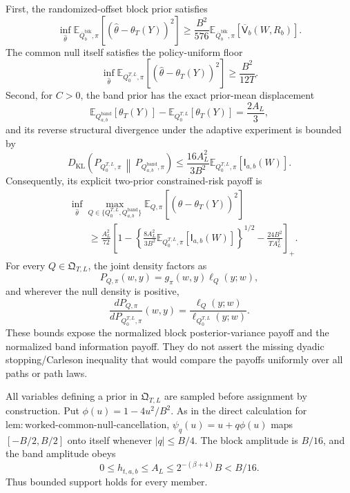 First, the randomized-offset block prior satisfies
\[
 \inf_{\widehat\theta}
 \mathbb E_{\overline Q_b^{\mathrm{blk}},\pi}
 \left[(\widehat\theta-\theta_T(Y))^2\right]
 \ge \frac{B^2}{576}
 \mathbb E_{\overline Q_b^{\mathrm{blk}},\pi}
 [\overline{\mathsf V}_b(W,R_b)].
\]
The common null itself satisfies the policy-uniform floor
\[
 \inf_{\widehat\theta}
 \mathbb E_{Q_0^{T,L},\pi}[(\widehat\theta-\theta_T(Y))^2]
 \ge\frac{B^2}{12T}.
\]
Second, for \(C>0\), the band prior has the exact prior-mean displacement
\[
 \mathbb E_{Q_{a,b}^{\mathrm{band}}}[\theta_T(Y)]
 -\mathbb E_{Q_0^{T,L}}[\theta_T(Y)]
 =\frac{2A_L}{3},
\]
and its reverse structural divergence under the adaptive experiment is bounded by
\[
 D_{\mathrm{KL}}\!\left(
 P_{Q_0^{T,L},\pi}\,\middle\|\,
 P_{Q_{a,b}^{\mathrm{band}},\pi}
 \right)
 \le \frac{16A_L^2}{3B^2}
 \mathbb E_{Q_0^{T,L},\pi}[\mathsf I_{a,b}(W)].
\]
Consequently, its explicit two-prior constrained-risk payoff is
\[
 \begin{aligned}
 &\inf_{\widehat\theta}\max_{Q\in\{Q_0^{T,L},Q_{a,b}^{\mathrm{band}}\}}
 \mathbb E_{Q,\pi}[(\widehat\theta-\theta_T(Y))^2]\\
 &\qquad\ge \frac{A_L^2}{72}
 \left[
 1-\left\{
 \frac{8A_L^2}{3B^2}
 \mathbb E_{Q_0^{T,L},\pi}[\mathsf I_{a,b}(W)]
 \right\}^{1/2}
 -\frac{24B^2}{TA_L^2}
 \right]_+.
 \end{aligned}
\]
For every \(Q\in\mathfrak Q_{T,L}\), the joint density factors as
\[
 P_{Q,\pi}(w,y)=g_\pi(w,y)\ell_Q(y;w),
\]
and wherever the null density is positive,
\[
 \frac{dP_{Q,\pi}}{dP_{Q_0^{T,L},\pi}}(w,y)
 =\frac{\ell_Q(y;w)}{\ell_{Q_0^{T,L}}(y;w)}.
\]
These bounds expose the normalized block posterior-variance payoff and the normalized band information payoff.  They do not assert the missing dyadic stopping/Carleson inequality that would compare the payoffs uniformly over all paths or path laws.

All variables defining a prior in \(\mathfrak Q_{T,L}\) are sampled before assignment by construction.  Put \(\phi(u)=1-4u^2/B^2\).  As in the direct calculation for \(\mathrm{lem{:}worked\mbox{-}common\mbox{-}null\mbox{-}cancellation}\), \(\psi_q(u)=u+q\phi(u)\) maps \([-B/2,B/2]\) onto itself whenever \(|q|\le B/4\).  The block amplitude is \(B/16\), and the band amplitude obeys
\[
 0\le h_{t,a,b}\le A_L
 \le 2^{-(\beta+4)}B<B/16.
\]
Thus bounded support holds for every member.

